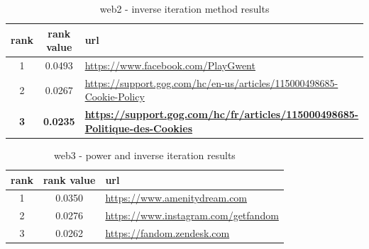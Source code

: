 \documentclass[unicode,11pt,a4paper,oneside,numbers=endperiod,openany]{scrartcl}
\begin{document}
{\begin{table}[htb!]
    \centering
    \begin{tabular}{ccp{10cm}}
        \toprule
        \textbf{rank} & \textbf{rank value} & \textbf{url} \\ 
        \midrule
        1 & 0.0493 & \url{https://www.facebook.com/PlayGwent} \\
        2 & 0.0267 & \url{https://support.gog.com/hc/en-us/articles/115000498685-Cookie-Policy} \\
        \textbf{3} & \textbf{0.0235} & \textbf{\url{https://support.gog.com/hc/fr/articles/115000498685-Politique-des-Cookies}} \\ 
        \bottomrule
    \end{tabular}
    \caption{web2 - inverse iteration method results}
\end{table}

\begin{table}[htb!]
    \centering
    \begin{tabular}{ccp{10cm}}
        \toprule
        \textbf{rank} & \textbf{rank value} & \textbf{url} \\ 
        \midrule
        1 & 0.0350 & \url{https://www.amenitydream.com} \\
        2 & 0.0276 & \url{https://www.instagram.com/getfandom} \\
        3 & 0.0262 & \url{https://fandom.zendesk.com} \\ 
        \bottomrule
    \end{tabular}
    \caption{web3 - power and inverse iteration results}
\end{table}
}
\end{document}

